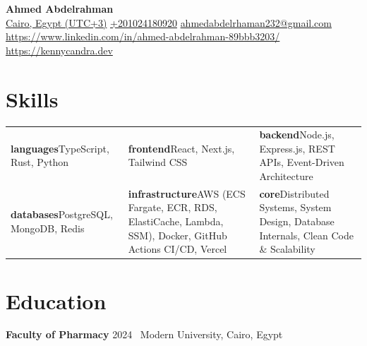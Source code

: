 \documentclass[11pt]{article}
\begin{document}
\begin{center}
{\LARGE \textbf{ Ahmed Abdelrahman }} \\[4pt]
\href{Cairo, Egypt (UTC+3)}{Cairo, Egypt (UTC+3)} \textbar{} \href{+201024180920}{+201024180920} \textbar{} \href{ahmedabdelrhaman232@gmail.com}{ahmedabdelrhaman232@gmail.com} \textbar{} \href{https://www.linkedin.com/in/ahmed-abdelrahman-89bbb3203/}{https://www.linkedin.com/in/ahmed-abdelrahman-89bbb3203/} \textbar{} \href{https://kennycandra.dev}{https://kennycandra.dev}
\end{center}

\section{Skills}
\begin{tabularx}{\textwidth}{X X X}
\textbf{languages}\newline TypeScript, Rust, Python & \textbf{frontend}\newline React, Next.js, Tailwind CSS & \textbf{backend}\newline Node.js, Express.js, REST APIs, Event-Driven Architecture \\
\textbf{databases}\newline PostgreSQL, MongoDB, Redis & \textbf{infrastructure}\newline AWS (ECS Fargate, ECR, RDS, ElastiCache, Lambda, SSM), Docker, GitHub Actions CI/CD, Vercel & \textbf{core}\newline Distributed Systems, System Design, Database Internals, Clean Code \& Scalability \\
\end{tabularx}

\section{Education}
\textbf{Faculty of Pharmacy} \hfill 2024 \
Modern University, Cairo, Egypt
\end{document}
